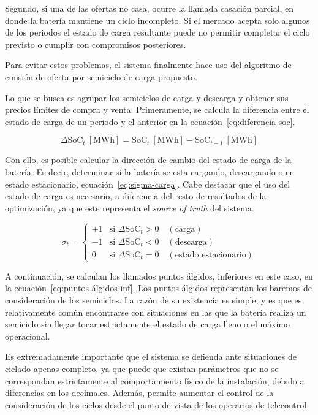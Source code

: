 Segundo, si una de las ofertas no casa, ocurre la llamada casación parcial, en donde la batería mantiene un ciclo incompleto. Si el mercado acepta solo algunos de los periodos el estado de carga resultante puede no permitir completar el ciclo previsto o cumplir con compromisos posteriores.

Para evitar estos problemas, el sistema finalmente hace uso del algoritmo de emisión de oferta por semiciclo de carga propuesto.

Lo que se busca es agrupar los semiciclos de carga y descarga y obtener sus precios límites de compra y venta. Primeramente, se calcula la diferencia entre el estado de carga de un periodo y el anterior en la ecuación~\ref{eq:diferencia-soc}.

\begin{equation}
  \label{eq:diferencia-soc}
  \Delta \mathrm{SoC}_{t}~[\text{MWh}] = \mathrm{SoC}_{t}~[\text{MWh}] - \mathrm{SoC}_{t-1}~[\text{MWh}]
\end{equation}

Con ello, es posible calcular la dirección de cambio del estado de carga de la batería. Es decir, determinar si la batería se esta cargando, descargando o en estado estacionario, ecuación~\ref{eq:sigma-carga}. Cabe destacar que el uso del estado de carga es necesario, a diferencia del resto de resultados de la optimización, ya que este representa el \textit{source of truth} del sistema.

\begin{equation}
  \label{eq:sigma-carga}
  \sigma_{t} =
  \begin{cases}
    +1 & \text{si } \Delta\mathrm{SoC}_{t} > 0 \quad (\text{carga})\\
    -1 & \text{si } \Delta\mathrm{SoC}_{t} < 0 \quad (\text{descarga})\\
    0  & \text{si } \Delta\mathrm{SoC}_{t} = 0 \quad (\text{estado estacionario})
  \end{cases}
\end{equation}

A continuación, se calculan los llamados puntos álgidos, inferiores en este caso, en la ecuación~\ref{eq:puntos-álgidos-inf}. Los puntos álgidos representan los baremos de consideración de los semiciclos. La razón de su existencia es simple, y es que es relativamente común encontrarse con situaciones en las que la batería realiza un semiciclo sin llegar tocar estrictamente el estado de carga lleno o el máximo operacional.

Es extremadamente importante que el sistema se defienda ante situaciones de ciclado apenas completo, ya que puede que existan parámetros que no se correspondan estrictamente al comportamiento físico de la instalación, debido a diferencias en los decimales. Además, permite aumentar el control de la consideración de los ciclos desde el punto de vista de los operarios de telecontrol.

